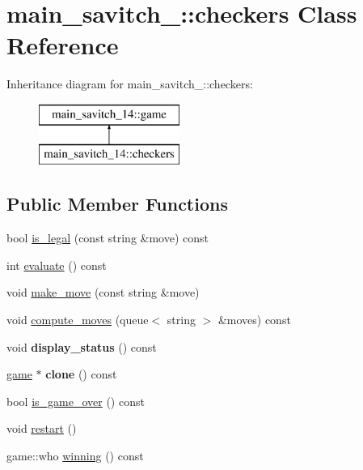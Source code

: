 \hypertarget{classmain__savitch__14_1_1checkers}{}\section{main\+\_\+savitch\+\_\+:\+:checkers Class Reference}
\label{classmain__savitch__14_1_1checkers}
Inheritance diagram for main\+\_\+savitch\+\_\+:\+:checkers\+:\begin{figure}[H]
\begin{center}
\leavevmode
\includegraphics[height=2.000000cm]{classmain__savitch__14_1_1checkers}
\end{center}
\end{figure}
\subsection*{Public Member Functions}
\begin{DoxyCompactItemize}
\item 
bool \hyperlink{classmain__savitch__14_1_1checkers_afc7d56fe1f0637a02cad352e9cda9ee3}{is\+\_\+legal} (const string \&move) const
\item 
int \hyperlink{classmain__savitch__14_1_1checkers_a1705b4e1bfe04205ebb7703925b50f9f}{evaluate} () const
\item 
void \hyperlink{classmain__savitch__14_1_1checkers_a8a08c0555d5b8c264472cc94a2f007e3}{make\+\_\+move} (const string \&move)
\item 
void \hyperlink{classmain__savitch__14_1_1checkers_aa4b4867ee171d04f5473f4ca38a9729a}{compute\+\_\+moves} (queue$<$ string $>$ \&moves) const
\item 
\mbox{\label{classmain__savitch__14_1_1checkers_aa99f69ed300d81b6340f87b59ebba031}} 
void {\bfseries display\+\_\+status} () const
\item 
\mbox{\label{classmain__savitch__14_1_1checkers_a716b963325b1455e63c25afe89d617d9}} 
\hyperlink{classmain__savitch__14_1_1game}{game} $\ast$ {\bfseries clone} () const
\item 
bool \hyperlink{classmain__savitch__14_1_1checkers_ab8481b1a443f4b190d3ff508ab6f62a7}{is\+\_\+game\+\_\+over} () const
\item 
void \hyperlink{classmain__savitch__14_1_1checkers_ad3ee0adbdabda9136ecd46b958c83d24}{restart} ()
\item 
game\+::who \hyperlink{classmain__savitch__14_1_1checkers_aad9a08662e9fdf62752c60997b29370e}{winning} () const
\end{DoxyCompactItemize}
